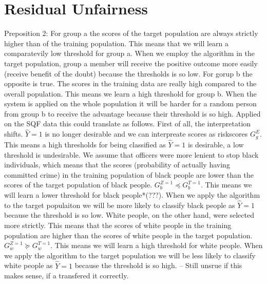 \section*{Residual Unfairness}
Preposition 2:
For group a the scores of the target population are always strictly higher than
of the training population. This means that we will learn a comparatevily low threshold for group a.
When we employ the algorithm in the target population, group a member will receive the positive outcome
 more easily (receive benefit of the doubt) because the thresholds is so low. For gorup b
 the opposite is true. The scores in the training data are really high compared to the overall population.
 This means we learn a high threshold for group b. When the system is applied on the whole population it will
 be harder for a random person from group b to receive the advantage because their threshold is so high.
Applied on the SQF data this could translate as follows. First of all, the interpretation shifts. $\hat{Y} = 1$ is 
no longer desirable and we can interpreate scores as riskscores $G_g^{E}$. This means a high thresholds for being classified as $\hat{Y} = 1$ is desirable, a low
threshold is undesirable. We assume that officers were more lenient to stop black individuals, which means that the scores (probability of actually having committed crime) in the training population
of black people are lower than the scores of the target population of black people.
$G_b^{Z=1} \preceq G_b^{T=1}$. This means we will learn a lower threshold for black people*(???). When we apply the algorithm
to the target populaiton we will be more likely to classify black people as $\hat{Y} = 1$ because the threshold is so low. White people, on the other hand,
were selected more strictly. This means that the scores of white people in the training population are higher than the scores of white people in the target population.
$G_w^{Z=1} \succeq G_w^{T=1}$. This means we will learn a high threshold for white people. When we apply the algorithm to the target population we will be less likely to classify white
people as $\hat{Y} = 1$ because the threshold is so high. -- Still unsrue if this makes sense, if a transfered it correctly.

